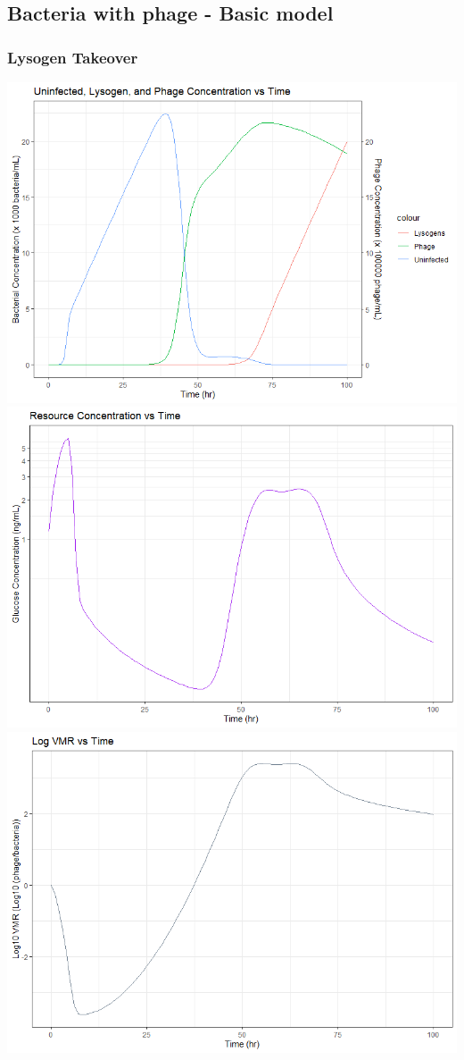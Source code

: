 \documentclass{article}
\begin{document}
\subsection {Bacteria with phage - Basic model}
\subsubsection{Lysogen Takeover}

\begin{center}
\includegraphics[scale=0.5]{plots/Basic_U_L_P.png}
\includegraphics[scale=0.5]{plots/Basic_R.png}
\includegraphics[scale=0.5]{plots/Basic_VMR.png}
\end{center}
\end{document}
